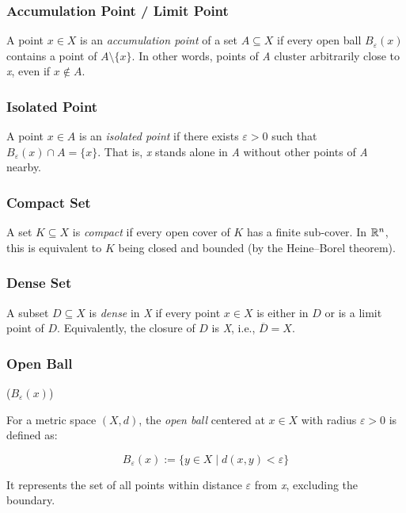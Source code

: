 \subsubsection{Accumulation Point / Limit Point}

A point \( x \in X \) is an \emph{accumulation point} of a set \( A \subseteq X \)
if every open ball \( B_\varepsilon(x) \) contains a point of \( A \setminus \{x\} \). 
In other words, points of \emph{A} cluster arbitrarily close to 
\emph{x}, even if \( x \notin A \).

\subsubsection{Isolated Point} 
	      
A point \( x \in A \) is an \emph{isolated point} if there exists \( \varepsilon > 0 \)
such that \( B_\varepsilon(x) \cap A = \{x\} \). 
That is, \emph{x} stands alone in \emph{A} without other points of \emph{A} nearby.

\subsubsection{Compact Set} 

A set \( K \subseteq X \) is \emph{compact} if every open cover of \( K \) has a finite sub-cover. 
In \(\mathbb{R}^n\), this is equivalent to \( K \) being closed and bounded (by the Heine–Borel theorem).

\subsubsection{Dense Set} 
	      
A subset \( D \subseteq X \) is \emph{dense} in \emph{X} if every point 
\( x \in X \) is either in \( D \) or is a limit point of \( D \). 
Equivalently, the closure of \( D \) is \emph{X}, i.e., \( \overline{D} = X \).

\subsubsection{Open Ball} (\( B_\varepsilon(x) \)) 

For a metric space \( (X, d) \), the \emph{open ball} centered at 
\( x \in X \) with radius \( \varepsilon > 0 \) is defined as: 
	      
\[
	B_\varepsilon(x) := \{ y \in X \mid d(x, y) < \varepsilon \}
\]

It represents the set of all points within distance \( \varepsilon \) from \emph{x}, excluding the boundary.
